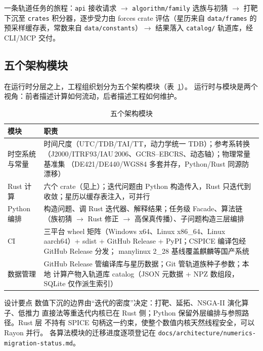 一条轨道任务的旅程：\texttt{api} 接收请求 $\to$ \texttt{algorithm/family}
选族与初猜 $\to$ 打靶下沉至 \texttt{crates} 积分器，逐步受力由 forces
crate 评估（星历来自 \texttt{data/frames} 的预采样缓存表，常数来自
\texttt{data/constants}）$\to$ 结果落入 \texttt{catalog/} 轨道库，经
CLI/MCP 交付。

\subsection{五个架构模块}

在运行时分层之上，工程组织划分为五个架构模块（表~\ref{tab:modules}）。
运行时与模块是两个视角：前者描述计算如何流动，后者描述工程如何维护。

\begin{table}[htbp]
\centering\small
\caption{五个架构模块}
\label{tab:modules}
\begin{tabularx}{\textwidth}{@{}lX@{}}
\toprule
\textbf{模块} & \textbf{职责} \\
\midrule
时空系统与常量 & 时间尺度（UTC/TDB/TAI/TT，动力学统一 TDB）；参考系转换
（J2000/ITRF93/IAU\,2006、GCRS--EBCRS、动态轴）；物理常量基准集
（DE421/DE440/WGS84 多套并存，Python/Rust 同源防漂移） \\
Rust 计算 & 六个 crate（见上）；迭代问题由 Python 构造传入，Rust 只迭代到
收敛；星历以缓存表注入，可并行 \\
Python 编排 & 构造问题、调 Rust 迭代器、解释结果；任务级 Facade、算法链
（族初猜 $\to$ Rust 修正 $\to$ 高保真传播）、子问题构造三层编排 \\
CI & 三平台 wheel 矩阵（Windows x64、Linux x86\_64、Linux aarch64）+ sdist +
GitHub Release + PyPI；CSPICE 编译包经 GitHub Release 分发；
manylinux 2\_28 基线覆盖麒麟等国产系统 \\
数据管理 & GitHub Release 管编译库与星历数据；Git 管轨道族种子参数；本地
计算产物入轨道库 catalog（JSON 元数据 + NPZ 数组段，SQLite 仅作派生索引） \\
\bottomrule
\end{tabularx}
\end{table}

\begin{keybox}{设计要点}
数值下沉的边界由“迭代的密度”决定：打靶、延拓、NSGA-II 演化算子、低推力
直接法等重迭代内核已在 Rust 侧；Python 保留外层编排与参照路径。Rust 层
不持有 SPICE 句柄这一约束，使整个数值内核天然线程安全，可以 Rayon 并行。
各算法模块的迁移进度逐项登记在
\texttt{docs/architecture/numerics-migration-status.md}。
\end{keybox}
